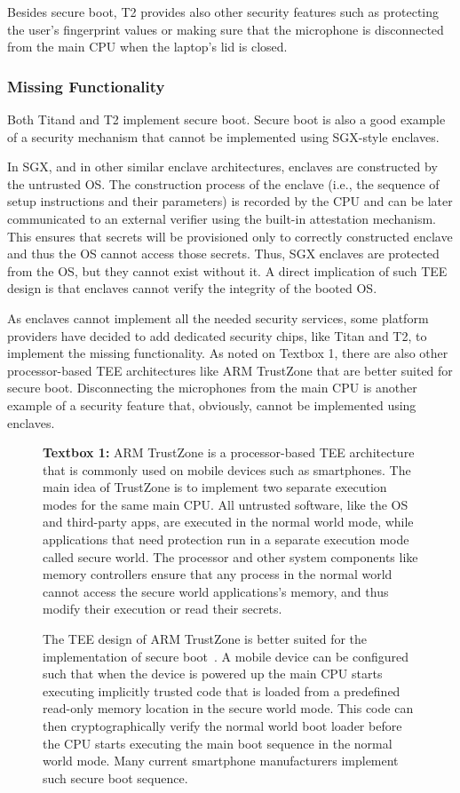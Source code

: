 Besides secure boot, T2 provides also other security features such as protecting the user’s fingerprint values or making sure that the microphone is disconnected from the main CPU when the laptop’s lid is closed. 
 
 
\subsubsection*{Missing Functionality}
  
Both Titand and T2 implement secure boot. Secure boot is also a good example of a security mechanism that cannot be implemented using SGX-style enclaves. 

In SGX, and in other similar enclave architectures, enclaves are constructed by the untrusted OS. The construction process of the enclave (i.e., the sequence of setup instructions and their parameters) is recorded by the CPU and can be later communicated to an external verifier using the built-in attestation mechanism. This ensures that secrets will be provisioned only to correctly constructed enclave and thus the OS cannot access those secrets. Thus, SGX enclaves are protected from the OS, but they cannot exist without it. A direct implication of such TEE design is that enclaves cannot verify the integrity of the booted OS. 

As enclaves cannot implement all the needed security services, some platform providers have decided to add dedicated security chips, like Titan and T2, to implement the missing functionality. As noted on Textbox 1, there are also other processor-based TEE architectures like ARM TrustZone that are better suited for secure boot.
%
Disconnecting the microphones from the main CPU is another example of a security feature that, obviously, cannot be implemented using enclaves.
  

\begin{figure}
	\begin{tcolorbox}
	\textbf{Textbox 1:} ARM TrustZone is a processor-based TEE architecture that is commonly used on mobile devices such as smartphones. The main idea of TrustZone is to implement two separate execution modes for the same main CPU. All untrusted software, like the OS and third-party apps, are executed in the normal world mode, while applications that need protection run in a separate execution mode called secure world. The processor and other system components like memory controllers ensure that any process in the normal world cannot access the secure world applications’s memory, and thus modify their execution or read their secrets.

	The TEE design of ARM TrustZone is better suited for the implementation of secure boot~\cite{arbaugh1997secure}. A mobile device can be configured such that when the device is powered up the main CPU starts executing implicitly trusted code that is loaded from a predefined read-only memory location in the secure world mode. This code can then cryptographically verify the normal world boot loader before the CPU starts executing the main boot sequence in the normal world mode. Many current smartphone manufacturers implement such secure boot sequence.
	\end{tcolorbox}
\end{figure}  


